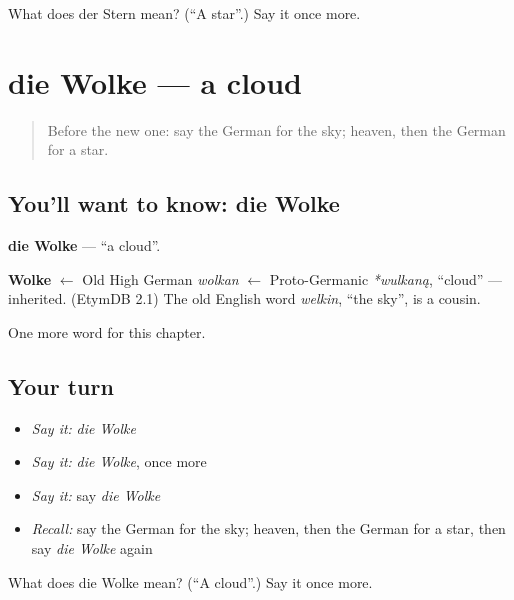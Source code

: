 \begin{tcolorbox}[breakable,colback=teal!4,colframe=teal!35!black,title={Before you move on}]
What does der Stern mean? (\textquotedblleft{}A star\textquotedblright{}.) Say it once more.
\end{tcolorbox}
\section[die Wolke]{die Wolke — a cloud}

\label{lesson:GE-C84-wolke}



\begin{quote}
Before the new one: say the German for the sky; heaven, then the German for a star.
\end{quote}

\subsection*{You'll want to know: die Wolke}
\textbf{die Wolke} — \textquotedblleft{}a cloud\textquotedblright{}.

\begin{cousinweb}
\textbf{Wolke} $\leftarrow$ Old High German \emph{wolkan} $\leftarrow$ Proto-Germanic \emph{*wulkaną}, \textquotedblleft{}cloud\textquotedblright{} — inherited. (EtymDB 2.1) The old English word \emph{welkin}, \textquotedblleft{}the sky\textquotedblright{}, is a cousin.
\end{cousinweb}

\begin{grammarlens}[title={What you've built}]
One more word for this chapter.
\end{grammarlens}

\subsection*{Your turn}
\begin{itemize}
\raggedright
  \item \emph{Say it:} \emph{die Wolke}
  \item \emph{Say it:} \emph{die Wolke}, once more
  \item \emph{Say it:} say \emph{die Wolke}
  \item \emph{Recall:} say the German for the sky; heaven, then the German for a star, then say \emph{die Wolke} again
\end{itemize}

\begin{tcolorbox}[breakable,colback=teal!4,colframe=teal!35!black,title={Before you move on}]
What does die Wolke mean? (\textquotedblleft{}A cloud\textquotedblright{}.) Say it once more.
\end{tcolorbox}
